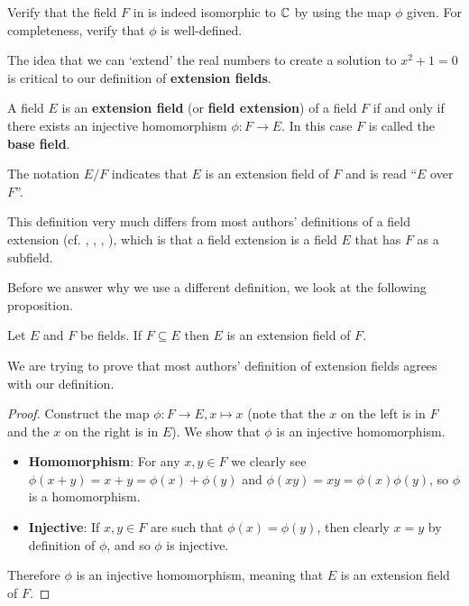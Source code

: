\begin{exercise}\label{exercise-R[x]-mod-x^2+1-is-isomorphic-to-C}
    Verify that the field $F$ in  is indeed isomorphic to $\mathbb{C}$ by using the map $\phi$ given. For completeness, verify that $\phi$ is well-defined.
\end{exercise}

The idea that we can `extend' the real numbers to create a solution to $x^2 + 1 = 0$ is critical to our definition of \textbf{extension fields}.

\begin{definition}
    A field $E$ is an \textbf{extension field} (or \textbf{field extension}) of a field $F$ if and only if there exists an injective homomorphism $\phi: F \to E$. In this case $F$ is called the \textbf{base field}.
    
    The notation $E/F$ indicates that $E$ is an extension field of $F$ and is read ``$E$ over $F$''.
\end{definition}
\begin{remark}
    This definition very much differs from most authors' definitions of a field extension (cf. \cite[p.~511]{dummit_foote_2004}, \cite[p.~442]{artin_2011}, \cite[p.~338]{gallian_2016}, \cite[p.~260]{judson_beezer_2022}), which is that a field extension is a field $E$ that has $F$ as a subfield.
\end{remark}

Before we answer why we use a different definition, we look at the following proposition.

\begin{proposition}
    Let $E$ and $F$ be fields. If $F \subseteq E$ then $E$ is an extension field of $F$.
\end{proposition}
\begin{remark}
    We are trying to prove that most authors' definition of extension fields agrees with our definition.
\end{remark}
\begin{proof}
    Construct the map $\phi: F \to E, x \mapsto x$ (note that the $x$ on the left is in $F$ and the $x$ on the right is in $E$). We show that $\phi$ is an injective homomorphism.
    \begin{itemize}
        \item \textbf{Homomorphism}: For any $x,y\in F$ we clearly see $\phi(x + y) = x + y = \phi(x) + \phi(y)$ and $\phi(xy) = xy = \phi(x)\phi(y)$, so $\phi$ is a homomorphism.
        
        \item \textbf{Injective}: If $x,y \in F$ are such that $\phi(x) = \phi(y)$, then clearly $x = y$ by definition of $\phi$, and so $\phi$ is injective.
    \end{itemize}
    Therefore $\phi$ is an injective homomorphism, meaning that $E$ is an extension field of $F$.
\end{proof}

